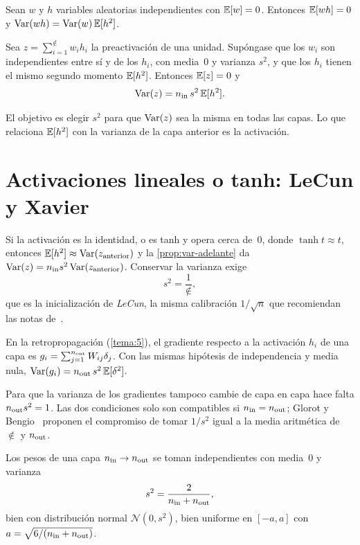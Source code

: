 \begin{lema}\label{lem:var-producto}
Sean $w$ y $h$ variables aleatorias independientes con $\mathbb{E}[w]=0$. Entonces $\mathbb{E}[wh]=0$ y $\operatorname{Var}(wh)=\operatorname{Var}(w)\,\mathbb{E}[h^{2}]$.
\end{lema}

\begin{proposicion}\label{prop:var-adelante}
Sea $z=\sum_{i=1}^{\nin}w_ih_i$ la preactivación de una unidad. Supóngase que los $w_i$ son independientes entre sí y de los $h_i$, con media~0 y varianza $s^{2}$, y que los $h_i$ tienen el mismo segundo momento $\mathbb{E}[h^{2}]$. Entonces $\mathbb{E}[z]=0$ y
\[
\operatorname{Var}(z)=n_{\mathrm{in}}\,s^{2}\,\mathbb{E}[h^{2}].
\]
\end{proposicion}

El objetivo es elegir $s^{2}$ para que $\operatorname{Var}(z)$ sea la misma en todas las capas. Lo que relaciona $\mathbb{E}[h^{2}]$ con la varianza de la capa anterior es la activación.

\section{Activaciones lineales o tanh: LeCun y Xavier}

Si la activación es la identidad, o es tanh y opera cerca de~0, donde $\tanh t\approx t$, entonces $\mathbb{E}[h^{2}]\approx\operatorname{Var}(z_{\text{anterior}})$ y la \cref{prop:var-adelante} da $\operatorname{Var}(z)=n_{\mathrm{in}} s^{2}\operatorname{Var}(z_{\text{anterior}})$. Conservar la varianza exige
\[
s^{2}=\frac{1}{\nin},
\]
que es la inicialización de \emph{LeCun}, la misma calibración $1/\sqrt{n}$ que recomiendan las notas de~\cite{cs231n}.

\begin{proposicion}\label{prop:var-atras}
En la retropropagación (\cref{tema:5}), el gradiente respecto a la activación $h_i$ de una capa es $g_i=\sum_{j=1}^{n_{\mathrm{out}}}W_{ij}\delta_j$. Con las mismas hipótesis de independencia y media nula, $\operatorname{Var}(g_i)=n_{\mathrm{out}}\,s^{2}\,\mathbb{E}[\delta^{2}]$.
\end{proposicion}

Para que la varianza de los gradientes tampoco cambie de capa en capa hace falta $n_{\mathrm{out}} s^{2}=1$. Las dos condiciones solo son compatibles si $n_{\mathrm{in}}=n_{\mathrm{out}}$; Glorot y Bengio~\cite{glorot} proponen el compromiso de tomar $1/s^{2}$ igual a la media aritmética de $\nin$ y $n_{\mathrm{out}}$.

\begin{definicion}\label{def:xavier}
Los pesos de una capa $n_{\mathrm{in}}\to n_{\mathrm{out}}$ se toman independientes con media~0 y varianza
\[
s^{2}=\frac{2}{n_{\mathrm{in}}+n_{\mathrm{out}}},
\]
bien con distribución normal $\mathcal{N}(0,s^{2})$, bien uniforme en $[-a,a]$ con $a=\sqrt{6/(n_{\mathrm{in}}+n_{\mathrm{out}})}$.
\end{definicion}

